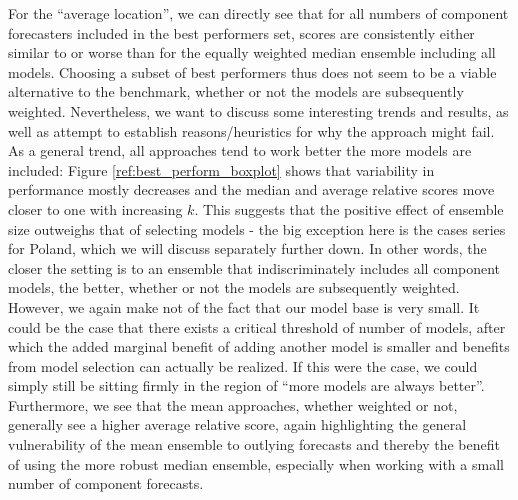 For the ``average location'', we can directly see that for all numbers of component forecasters included in the best performers set, scores are consistently either similar to or worse than for the equally weighted median ensemble including all models. Choosing a subset of best performers thus does not seem to be a viable alternative to the benchmark, whether or not the models are subsequently weighted. Nevertheless, we want to discuss some interesting trends and results, as well as attempt to establish reasons/heuristics for why the approach might fail.\\
As a general trend, all approaches tend to work better the more models are included: Figure \ref{ref:best_perform_boxplot} shows that variability in performance mostly decreases and the median and average relative scores move closer to one with increasing $k$. This suggests that the positive effect of ensemble size outweighs that of selecting models - the big exception here is the cases series for Poland, which we will discuss separately further down. In other words, the closer the setting is to an ensemble that indiscriminately includes all component models, the better, whether or not the models are subsequently weighted. However, we again make not of the fact that our model base is very small. It could be the case that there exists a critical threshold of number of models, after which the added marginal benefit of adding another model is smaller and benefits from model selection can actually be realized. If this were the case, we could simply still be sitting firmly in the region of ``more models are always better''.\\
Furthermore, we see that the mean approaches, whether weighted or not, generally see a higher average relative score, again highlighting the general vulnerability of the mean ensemble to outlying forecasts and thereby the benefit of using the more robust median ensemble, especially when working with a small number of component forecasts. 
